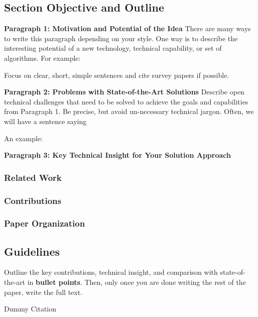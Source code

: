 \subsection{Section Objective and Outline}

\textbf{Paragraph 1: Motivation and Potential of the Idea}
There are many ways to write this paragraph depending on your style.
One way is to describe the interesting potential of a new technology, technical capability, or set of algorithms. For example: 

\begin{quote}
\end{quote}

Focus on clear, short, simple sentences and cite survey papers if possible.

\textbf{Paragraph 2: Problems with State-of-the-Art Solutions}
Describe open technical challenges that need to be solved to achieve the goals and capabilities from Paragraph 1. Be precise, but avoid un-necessary technical jargon. Often, we will have a sentence saying 

An example: 
\begin{quote}
\end{quote}

\textbf{Paragraph 3: Key Technical Insight for Your Solution Approach}

\subsubsection{Related Work}

\subsubsection{Contributions }

\subsubsection{Paper Organization }

\subsection{Guidelines}
Outline the key contributions, technical insight, and comparison with state-of-the-art in \textbf{bullet points}. Then, only once you are done writing the rest of the paper, write the full text.

Dummy Citation \cite{alvar2019multi}
